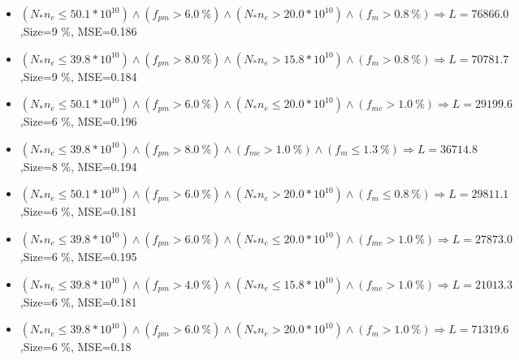 \documentclass[numbered]{CSL}
\begin{document}
\begin{itemize}
\item $(N_* n_e \leq 50.1 * 10^{10}) \land (f_{pm} > 6.0~\%) \land (N_* n_e > 20.0 * 10^{10}) \land (f_m > 0.8~\%) \Rightarrow L = 76866.0$,\hfill Size=9 \%, MSE=0.186
\item $(N_* n_e \leq 39.8 * 10^{10}) \land (f_{pm} > 8.0~\%) \land (N_* n_e > 15.8 * 10^{10}) \land (f_m > 0.8~\%) \Rightarrow L = 70781.7$,\hfill Size=9 \%, MSE=0.184
\item $(N_* n_e \leq 50.1 * 10^{10}) \land (f_{pm} > 6.0~\%) \land (N_* n_e \leq 20.0 * 10^{10}) \land (f_{me} > 1.0~\%) \Rightarrow L = 29199.6$,\hfill Size=6 \%, MSE=0.196
\item $(N_* n_e \leq 39.8 * 10^{10}) \land (f_{pm} > 8.0~\%) \land (f_{me} > 1.0~\%) \land (f_m \leq 1.3~\%) \Rightarrow L = 36714.8$,\hfill Size=8 \%, MSE=0.194
\item $(N_* n_e \leq 50.1 * 10^{10}) \land (f_{pm} > 6.0~\%) \land (N_* n_e > 20.0 * 10^{10}) \land (f_m \leq 0.8~\%) \Rightarrow L = 29811.1$,\hfill Size=6 \%, MSE=0.181
\item $(N_* n_e \leq 39.8 * 10^{10}) \land (f_{pm} > 6.0~\%) \land (N_* n_e \leq 20.0 * 10^{10}) \land (f_{me} > 1.0~\%) \Rightarrow L = 27873.0$,\hfill Size=6 \%, MSE=0.195
\item $(N_* n_e \leq 39.8 * 10^{10}) \land (f_{pm} > 4.0~\%) \land (N_* n_e \leq 15.8 * 10^{10}) \land (f_{me} > 1.0~\%) \Rightarrow L = 21013.3$,\hfill Size=6 \%, MSE=0.181
\item $(N_* n_e \leq 39.8 * 10^{10}) \land (f_{pm} > 6.0~\%) \land (N_* n_e > 20.0 * 10^{10}) \land (f_m > 1.0~\%) \Rightarrow L = 71319.6$,\hfill Size=6 \%, MSE=0.18
\end{itemize}
\end{document}
